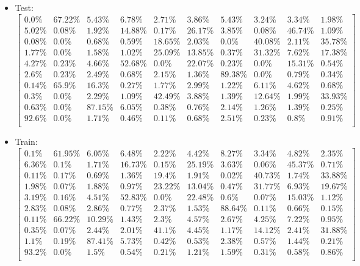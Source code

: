 \documentclass[a4paper,14pt]{report}
\begin{document}
	\begin{itemize}
		\item Test:
		$
		\begin{bmatrix}
		0.0\% & 67.22\% & 5.43\% & 6.78\% & 2.71\% & 3.86\% & 5.43\% & 3.24\% & 3.34\% & 1.98\% \\ 
		5.02\% & 0.08\% & 1.92\% & 14.88\% & 0.17\% & 26.17\% & 3.85\% & 0.08\% & 46.74\% & 1.09\% \\ 
		0.08\% & 0.0\% & 0.68\% & 0.59\% & 18.65\% & 2.03\% & 0.0\% & 40.08\% & 2.11\% & 35.78\% \\ 
		1.77\% & 0.0\% & 1.58\% & 1.02\% & 25.09\% & 13.85\% & 0.37\% & 31.32\% & 7.62\% & 17.38\% \\ 
		4.27\% & 0.23\% & 4.66\% & 52.68\% & 0.0\% & 22.07\% & 0.23\% & 0.0\% & 15.31\% & 0.54\% \\ 
		2.6\% & 0.23\% & 2.49\% & 0.68\% & 2.15\% & 1.36\% & 89.38\% & 0.0\% & 0.79\% & 0.34\% \\ 
		0.14\% & 65.9\% & 16.3\% & 0.27\% & 1.77\% & 2.99\% & 1.22\% & 6.11\% & 4.62\% & 0.68\% \\ 
		0.3\% & 0.0\% & 2.29\% & 1.09\% & 42.49\% & 3.88\% & 1.39\% & 12.64\% & 1.99\% & 33.93\% \\ 
		0.63\% & 0.0\% & 87.15\% & 6.05\% & 0.38\% & 0.76\% & 2.14\% & 1.26\% & 1.39\% & 0.25\% \\ 
		92.6\% & 0.0\% & 1.71\% & 0.46\% & 0.11\% & 0.68\% & 2.51\% & 0.23\% & 0.8\% & 0.91\% \\
		\end{bmatrix} 
		$
		\item Train:
		$
		\begin{bmatrix}
		0.1\% & 61.95\% & 6.05\% & 6.48\% & 2.22\% & 4.42\% & 8.27\% & 3.34\% & 4.82\% & 2.35\% \\ 
		6.36\% & 0.1\% & 1.71\% & 16.73\% & 0.15\% & 25.19\% & 3.63\% & 0.06\% & 45.37\% & 0.71\% \\ 
		0.11\% & 0.17\% & 0.69\% & 1.36\% & 19.4\% & 1.91\% & 0.02\% & 40.73\% & 1.74\% & 33.88\% \\ 
		1.98\% & 0.07\% & 1.88\% & 0.97\% & 23.22\% & 13.04\% & 0.47\% & 31.77\% & 6.93\% & 19.67\% \\ 
		3.19\% & 0.16\% & 4.51\% & 52.83\% & 0.0\% & 22.48\% & 0.6\% & 0.07\% & 15.03\% & 1.12\% \\ 
		2.83\% & 0.08\% & 2.86\% & 0.77\% & 2.37\% & 1.53\% & 88.64\% & 0.11\% & 0.66\% & 0.15\% \\ 
		0.11\% & 66.22\% & 10.29\% & 1.43\% & 2.3\% & 4.57\% & 2.67\% & 4.25\% & 7.22\% & 0.95\% \\ 
		0.35\% & 0.07\% & 2.44\% & 2.01\% & 41.1\% & 4.45\% & 1.17\% & 14.12\% & 2.41\% & 31.88\% \\ 
		1.1\% & 0.19\% & 87.41\% & 5.73\% & 0.42\% & 0.53\% & 2.38\% & 0.57\% & 1.44\% & 0.21\% \\ 
		93.2\% & 0.0\% & 1.5\% & 0.54\% & 0.21\% & 1.21\% & 1.59\% & 0.31\% & 0.58\% & 0.86\% \\
		\end{bmatrix} 
		$
	\end{itemize}
\end{document}
